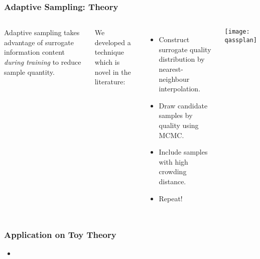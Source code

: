 \begin{frame}
	\frametitle{Adaptive Sampling: Theory}
	 \begin{columns}[onlytextwidth,T]
      \column{\dimexpr\linewidth-6cm-5mm}
        
        Adaptive sampling takes advantage of surrogate information content \textit{during training} to reduce sample quantity.\newline
        
        We developed a technique which is novel in the literature:
        \begin{itemize}
        \item Construct surrogate quality distribution by nearest- neighbour interpolation.
        \item Draw candidate samples by quality using MCMC.
        \item Include samples with high crowding distance.
        \item Repeat!
        \end{itemize}
      \column{6cm}
      \texttt{[image: qassplan]}

    \end{columns}
\end{frame}

\begin{frame}
	\frametitle{Application on Toy Theory}
	\begin{itemize}
		\item %
	\end{itemize}
\end{frame}
